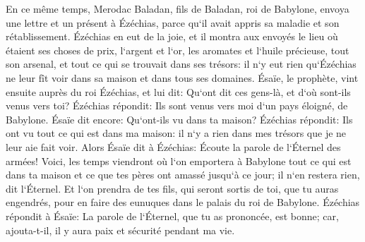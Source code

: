 \verse En ce même temps, Merodac Baladan, fils de Baladan, roi de Babylone, envoya une lettre et un présent à Ézéchias, parce qu`il avait appris sa maladie et son rétablissement. 
\verse Ézéchias en eut de la joie, et il montra aux envoyés le lieu où étaient ses choses de prix, l`argent et l`or, les aromates et l`huile précieuse, tout son arsenal, et tout ce qui se trouvait dans ses trésors: il n`y eut rien qu`Ézéchias ne leur fît voir dans sa maison et dans tous ses domaines. 
\verse Ésaïe, le prophète, vint ensuite auprès du roi Ézéchias, et lui dit: Qu`ont dit ces gens-là, et d`où sont-ils venus vers toi? Ézéchias répondit: Ils sont venus vers moi d`un pays éloigné, de Babylone. 
\verse Ésaïe dit encore: Qu`ont-ils vu dans ta maison? Ézéchias répondit: Ils ont vu tout ce qui est dans ma maison: il n`y a rien dans mes trésors que je ne leur aie fait voir. 
\verse Alors Ésaïe dit à Ézéchias: Écoute la parole de l`Éternel des armées! 
\verse Voici, les temps viendront où l`on emportera à Babylone tout ce qui est dans ta maison et ce que tes pères ont amassé jusqu`à ce jour; il n`en restera rien, dit l`Éternel. 
\verse Et l`on prendra de tes fils, qui seront sortis de toi, que tu auras engendrés, pour en faire des eunuques dans le palais du roi de Babylone. 
\verse Ézéchias répondit à Ésaïe: La parole de l`Éternel, que tu as prononcée, est bonne; car, ajouta-t-il, il y aura paix et sécurité pendant ma vie. 

